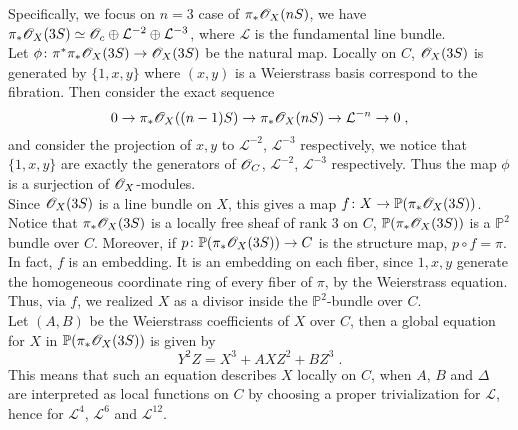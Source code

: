 Specifically, we focus on $n=3$ case of $\pi_*\mathscr{O}_X(nS)$, we have $\pi_*\mathscr{O}_X(3S)\simeq \mathscr{O}_c\oplus \mathcal{L}^{-2}\oplus \mathcal{L}^{-3}$, where $\mathcal{L}$ is the fundamental line bundle.\\ \indent
Let $\phi\colon \pi^*\pi_*\mathscr{O}_X(3S)\rightarrow \mathscr{O}_X(3S)$ be the natural map. Locally on $C$, $\mathscr{O}_X(3S)$ is generated by $\{1,x,y\}$ where $(x,y)$ is a Weierstrass basis correspond to the fibration. Then consider the exact sequence
$$0\rightarrow \pi_*\mathscr{O}_X((n-1)S)\rightarrow \pi_*\mathscr{O}_X(nS)\rightarrow \mathcal{L}^{-n}\rightarrow 0\; ,$$
and consider the projection of $x,y$ to $\mathcal{L}^{-2}$, $\mathcal{L}^{-3}$ respectively, we notice that $\{1,x,y\}$ are exactly the generators of $\mathscr{O}_C$, $\mathcal{L}^{-2}$, $\mathcal{L}^{-3}$ respectively. Thus the map $\phi$ is a surjection of $\mathscr{O}_X$-modules.\\ \indent
Since $\mathscr{O}_X(3S)$ is a line bundle on $X$, this gives a map $f\colon X\rightarrow \mathbb{P}(\pi_*\mathscr{O}_X(3S))$. Notice that $\pi_*\mathscr{O}_X(3S)$ is a locally free sheaf of rank 3 on $C$, $\mathbb{P}(\pi_*\mathscr{O}_X(3S))$ is a $\mathbb{P}^2$ bundle over $C$. Moreover, if $p\colon\mathbb{P}(\pi_*\mathscr{O}_X(3S))\rightarrow C$ is the structure map, $p\circ f=\pi$.\\ \indent
In fact, $f$ is an embedding. It is an embedding on each fiber, since $1,x,y$ generate the homogeneous coordinate ring of every fiber of $\pi$, by the Weierstrass equation. Thus, via $f$, we realized $X$ as a divisor inside the $\mathbb{P}^2$-bundle over $C$.\\ \indent
Let $(A,B)$ be the Weierstrass coefficients of $X$ over $C$, then a global equation for $X$ in $\mathbb{P}(\pi_*\mathscr{O}_X(3S))$ is given by $$Y^2Z=X^3+AXZ^2+BZ^3\; .$$
\indent This means that such an equation describes $X$ locally on $C$, when $A$, $B$ and $\Delta$ are interpreted as local functions on $C$ by choosing a proper trivialization for $\mathcal{L}$, hence for $\mathcal{L}^{4}$, $\mathcal{L}^6$ and $\mathcal{L}^{12}$. 


